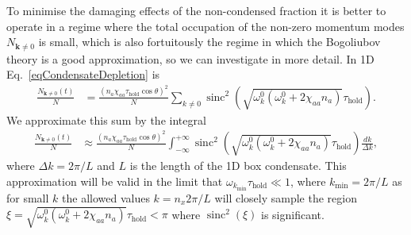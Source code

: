 \documentclass{iopart}
\DeclareMathOperator{\sinc}{sinc}
\begin{document}

To minimise the damaging effects of the non-condensed fraction it is better to operate in a regime where the total occupation of the non-zero momentum modes $N_{\mathbf{k}\neq 0}$ is small, which is also fortuitously the regime in which the Bogoliubov theory is a good approximation, so we can investigate in more detail.  In 1D Eq.~\eqref{eqCondensateDepletion} is
\begin{align}
  \frac{N_{\mathbf{k}\neq 0}(t)}{N} &= \frac{(n_a \chi_{aa} \tau_\text{hold} \cos\theta)^2}{N} \sum_{k \neq 0} \sinc^2\left(\sqrt{\omega^0_{k}(\omega^0_{k}+2 \chi_{aa}n_a)}\tau_\text{hold}\right).
\end{align}
We approximate this sum by the integral
\begin{align}
  \frac{N_{\mathbf{k}\neq 0}(t)}{N} &\approx \frac{(n_a \chi_{aa} \tau_\text{hold} \cos\theta)^2}{N} \int_{-\infty}^{+\infty} \sinc^2 \left(\sqrt{\omega^0_{k}(\omega^0_{k}+2 \chi_{aa}n_a)}\tau_\text{hold}\right) \frac{d k}{\Delta k}, \label{eqCondensateDepletionFirstIntegralApproximation}
\end{align}
where $\Delta k = 2\pi/L$ and $L$ is the length of the 1D box condensate.  This approximation will be valid in the limit that $\omega_{k_\text{min}} \tau_\text{hold} \ll 1$, where $k_\text{min} = 2\pi/L$ as for small $k$ the allowed values $k = n_x 2\pi /L$ will closely sample the region $\xi = \sqrt{\omega_k^0(\omega_k^0 + 2 \chi_{aa} n_a)} \tau_\text{hold} < \pi$ where $\sinc^2(\xi)$ is significant.
\end{document}

